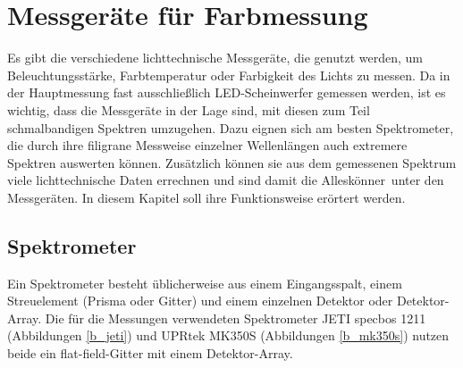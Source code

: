 \chapter{Messgeräte für Farbmessung}
Es gibt die verschiedene lichttechnische Messgeräte, die genutzt werden, um Beleuchtungsstärke, Farbtemperatur oder Farbigkeit des Lichts zu messen. Da in der Hauptmessung fast ausschließlich LED-Scheinwerfer gemessen werden, ist es wichtig, dass die Messgeräte in der Lage sind, mit diesen zum Teil schmalbandigen Spektren umzugehen. Dazu eignen sich am besten Spektrometer, die durch ihre filigrane Messweise einzelner Wellenlängen auch extremere Spektren auswerten können. Zusätzlich können sie aus dem gemessenen Spektrum viele lichttechnische Daten errechnen und sind damit die \glqq Alleskönner\grqq\ unter den Messgeräten. In diesem Kapitel soll ihre Funktionsweise erörtert werden.
 
\section{Spektrometer}
Ein Spektrometer besteht üblicherweise aus einem Eingangsspalt, einem Streuelement (Prisma oder Gitter) und einem einzelnen Detektor oder Detektor-Array. Die für die Messungen verwendeten Spektrometer JETI specbos 1211 (Abbildungen \ref{b_jeti}) und UPRtek MK350S (Abbildungen \ref{b_mk350s}) nutzen beide ein flat-field-Gitter mit einem Detektor-Array.

